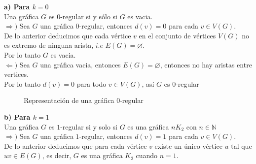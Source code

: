 \documentclass[12pt]{article}
\begin{document}
\textbf{a) Para $k = 0$}\\

Una gráfica $G$ es $0$-regular si y sólo si $G$ es vacia.\\

$\Longrightarrow)$ Sea $G$ una gráfica $0$-regular, entonces $d(v) = 0$ para cada $v \in V(G)$.\\

De lo anterior deducimos que cada vértice $v$ en el conjunto de vértices $V(G)$ no es extremo 
de ninguna arista, $i.e$ $E(G) = \varnothing$.\\

Por lo tanto $G$ es vacia.\\

$\Longleftarrow)$ Sea $G$ una gráfica vacia, entonces $E(G) = \varnothing$, entonces no hay aristas entre vertices.\\

Por lo tanto $d(v) = 0$ para todo $v \in V(G)$, así $G$ es $0$-regular\\

\begin{figure}[h!]
    \centering
    \begin{minipage}{0.6\textwidth}
        \centering
        \caption{Representación de una gráfica $0$-regular}
    \end{minipage}
\end{figure}

\textbf{b) Para $k = 1$}\\

Una gráfica $G$ es $1$-regular si y solo si $G$ es una gráfica $nK_2$ con $n \in \mathbb{N}$\\

$\Longrightarrow)$ Sea $G$ una gráfica $1$-regular, entonces $d(v) = 1$ para cada $v \in V(G)$.\\

De lo anterior deducimos que para cada vértice $v$ existe un único vértice $u$ tal que $uv \in E(G)$, 
es decir, $G$  es una gráfica $K_2$ cuando $n = 1$.\\
\end{document}
